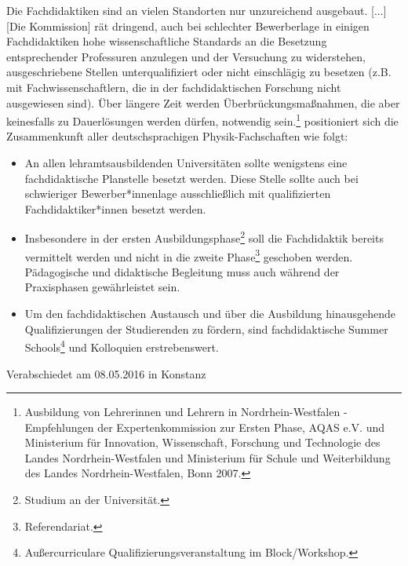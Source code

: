 \documentclass[DIV=calc]{scrartcl}
\begin{document}
\glqq Die Fachdidaktiken sind an vielen Standorten nur unzureichend ausgebaut. [...] [Die Kommission] rät dringend, auch bei schlechter Bewerberlage in einigen Fachdidaktiken hohe wissenschaftliche Standards an die Besetzung entsprechender Professuren anzulegen und der Versuchung zu widerstehen, ausgeschriebene Stellen unterqualifiziert oder nicht einschlägig zu besetzen (z.B. mit Fachwissenschaftlern, die in der fachdidaktischen Forschung nicht ausgewiesen sind). Über längere Zeit werden Überbrückungsmaßnahmen, die aber keinesfalls zu Dauerlösungen werden dürfen, notwendig sein.\grqq\footnote{Ausbildung von Lehrerinnen und Lehrern in
Nordrhein-Westfalen - Empfehlungen der Expertenkommission zur Ersten Phase, AQAS e.V. und Ministerium für Innovation, Wissenschaft, Forschung und Technologie des Landes Nordrhein-Westfalen und Ministerium für Schule und Weiterbildung des Landes Nordrhein-Westfalen, Bonn 2007.} positioniert sich die Zusammenkunft aller deutschsprachigen Physik-Fachschaften wie folgt:
\begin{itemize}
\item An allen lehramtsausbildenden Universitäten sollte wenigstens eine fachdidaktische Planstelle besetzt werden. Diese Stelle sollte auch bei schwieriger Bewerber*innenlage ausschließlich mit qualifizierten Fachdidaktiker*innen besetzt werden.
\item Insbesondere in der ersten Ausbildungsphase\footnote{Studium an der Universität.} soll die Fachdidaktik bereits vermittelt werden und nicht in die zweite Phase\footnote{Referendariat.} geschoben werden. Pädagogische und didaktische Begleitung muss auch während der Praxisphasen gewährleistet sein.
\item Um den fachdidaktischen Austausch und über die Ausbildung hinausgehende Qualifizierungen der Studierenden zu fördern, sind fachdidaktische Summer Schools\footnote{Außercurriculare Qualifizierungsveranstaltung im Block/Workshop.} und Kolloquien erstrebenswert.
\end{itemize}

\vfill
\begin{flushright}
Verabschiedet am 08.05.2016 in Konstanz
\end{flushright}
\end{document}
